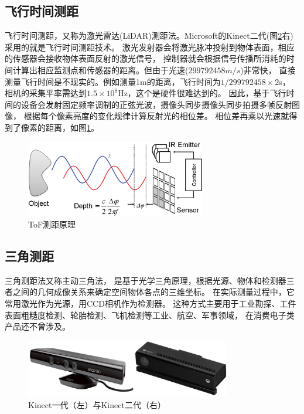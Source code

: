 \subsection{飞行时间测距}
飞行时间测距，又称为激光雷达(LiDAR)测距法。Microsoft的Kinect二代(图\ref{kinect_v1_v2}右)采用的就是飞行时间测距技术。
激光发射器会将激光脉冲投射到物体表面，相应的传感器会接收物体表面反射的激光信号，
控制器就会根据信号传播所消耗的时间计算出相应监测点和传感器的距离。但由于光速(\(299792458 m/s\))非常快，
直接测量飞行时间是不现实的。例如测量1m的距离，飞行时间为\(1/299792458 \times 2\)s，
相机的采集平率需达到\(1.5 \times 10^8\)Hz，这个是硬件很难达到的。
因此，基于飞行时间的设备会发射固定频率调制的正弦光波，摄像头同步摄像头同步拍摄多帧反射图像，
根据每个像素亮度的变化规律计算反射光的相位差。
相位差再乘以光速就得到了像素的距离，如图\ref{tof}。
\begin{figure}[h]
    \centering
    \includegraphics[width = 0.7\textwidth]{./Pictures/TOF.eps}
    \caption{ToF测距原理}
    \label{tof}
\end{figure}

\subsection{三角测距}
三角测距法又称主动三角法，
是基于光学三角原理，根据光源、物体和检测器三者之间的几何成像关系来确定空间物体各点的三维坐标。
在实际测量过程中，它常用激光作为光源，用CCD相机作为检测器。
这种方式主要用于工业勘探、工件表面粗糙度检测、轮胎检测、飞机检测等工业、航空、军事领域，
在消费电子类产品还不曾涉及。
\begin{figure}[h]
    \centering
    \includegraphics[width = 0.8\textwidth]{./Pictures/kinect_v1_v2.eps}
    \caption{Kinect一代（左）与Kinect二代（右）}
    \label{kinect_v1_v2}
\end{figure}

